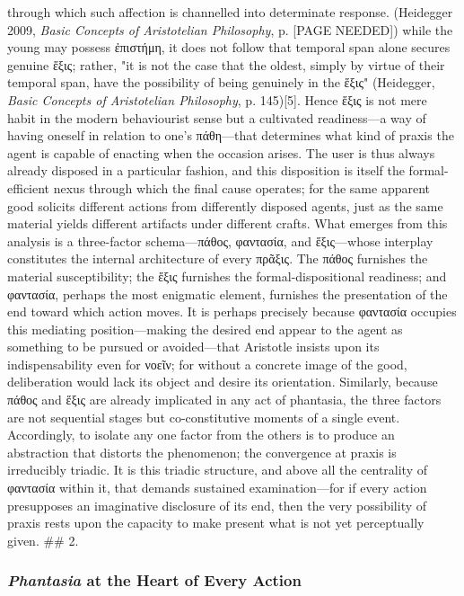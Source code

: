 \documentclass{article}
\begin{document}
through which such affection is channelled into determinate response. (Heidegger 2009, \textit{Basic Concepts of Aristotelian Philosophy}, p. [PAGE NEEDED]) while the young may possess ἐπιστήμη, it does not follow that temporal span alone secures genuine ἕξις; rather, "it is not the case that the oldest, simply by virtue of their temporal span, have the possibility of being genuinely in the ἕξις" (Heidegger, \textit{Basic Concepts of Aristotelian Philosophy}, p. 145)[5]. Hence ἕξις is not mere habit in the modern behaviourist sense but a cultivated readiness—a way of having oneself in relation to one's πάθη—that determines what kind of praxis the agent is capable of enacting when the occasion arises. The user is thus always already disposed in a particular fashion, and this disposition is itself the formal-efficient nexus through which the final cause operates; for the same apparent good solicits different actions from differently disposed agents, just as the same material yields different artifacts under different crafts. What emerges from this analysis is a three-factor schema—πάθος, φαντασία, and ἕξις—whose interplay constitutes the internal architecture of every πρᾶξις. The πάθος furnishes the material susceptibility; the ἕξις furnishes the formal-dispositional readiness; and φαντασία, perhaps the most enigmatic element, furnishes the presentation of the end toward which action moves. It is perhaps precisely because φαντασία occupies this mediating position—making the desired end appear to the agent as something to be pursued or avoided—that Aristotle insists upon its indispensability even for νοεῖν; for without a concrete image of the good, deliberation would lack its object and desire its orientation. Similarly, because πάθος and ἕξις are already implicated in any act of phantasia, the three factors are not sequential stages but co-constitutive moments of a single event. Accordingly, to isolate any one factor from the others is to produce an abstraction that distorts the phenomenon; the convergence at praxis is irreducibly triadic. It is this triadic structure, and above all the centrality of φαντασία within it, that demands sustained examination—for if every action presupposes an imaginative disclosure of its end, then the very possibility of praxis rests upon the capacity to make present what is not yet perceptually given. ## 2. 

\subsubsection*{\textit{Phantasia} at the Heart of Every Action}
\end{document}
